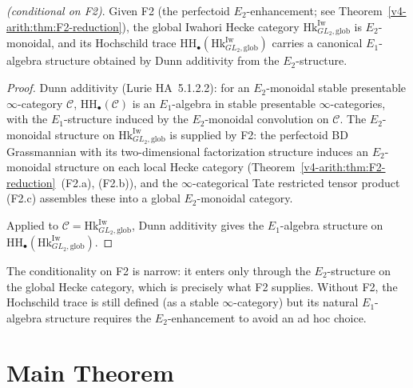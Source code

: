 \begin{proposition}
\label{v4-arith:bzn:prop:E1-on-HH}
\emph{(conditional on F2)}.
Given F2 (the perfectoid \(E_{2}\)-enhancement; see
Theorem~\ref{v4-arith:thm:F2-reduction}), the global Iwahori Hecke
category \(\mathrm{Hk}^{\mathrm{Iw}}_{GL_{2},\mathrm{glob}}\) is
\(E_{2}\)-monoidal, and its Hochschild trace
\(\mathrm{HH}_{\bullet}(\mathrm{Hk}^{\mathrm{Iw}}_{GL_{2},\mathrm{glob}})\)
carries a canonical \(E_{1}\)-algebra structure obtained by Dunn
additivity from the \(E_{2}\)-structure.
\end{proposition}

\begin{proof}
Dunn additivity (Lurie HA~5.1.2.2): for an \(E_{2}\)-monoidal
stable presentable \(\infty\)-category \(\mathcal{C}\),
\(\mathrm{HH}_{\bullet}(\mathcal{C})\) is an \(E_{1}\)-algebra in
stable presentable \(\infty\)-categories, with the \(E_{1}\)-structure
induced by the \(E_{2}\)-monoidal convolution on \(\mathcal{C}\).
The \(E_{2}\)-monoidal structure on
\(\mathrm{Hk}^{\mathrm{Iw}}_{GL_{2},\mathrm{glob}}\) is supplied by
F2: the perfectoid BD Grassmannian with its two-dimensional
factorization structure induces an \(E_{2}\)-monoidal structure on
each local Hecke category
(Theorem~\ref{v4-arith:thm:F2-reduction}~(F2.a), (F2.b)), and the
\(\infty\)-categorical Tate restricted tensor product (F2.c)
assembles these into a global \(E_{2}\)-monoidal category.

Applied to \(\mathcal{C}=\mathrm{Hk}^{\mathrm{Iw}}_{GL_{2},\mathrm{glob}}\),
Dunn additivity gives the \(E_{1}\)-algebra structure on
\(\mathrm{HH}_{\bullet}(\mathrm{Hk}^{\mathrm{Iw}}_{GL_{2},\mathrm{glob}})\).
\end{proof}

\begin{remark}
\label{v4-arith:bzn:rem:F2-domain}
The conditionality on F2 is narrow: it enters only through the
\(E_{2}\)-structure on the global Hecke category, which is precisely
what F2 supplies. Without F2, the Hochschild trace is still
defined (as a stable \(\infty\)-category) but its natural
\(E_{1}\)-algebra structure requires the \(E_{2}\)-enhancement to
avoid an ad hoc choice.
\end{remark}

\section{Main Theorem}
\label{v4-arith:bzn:main-theorem}

